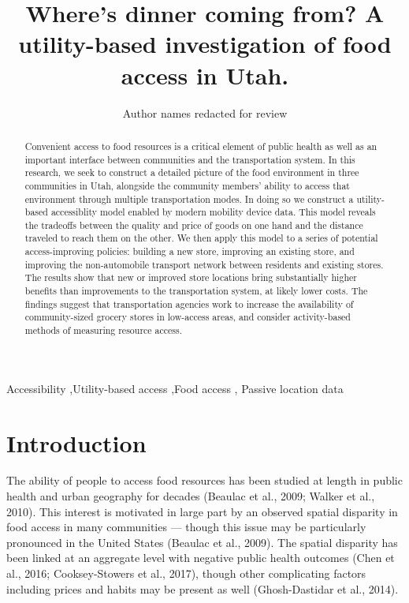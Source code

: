 \documentclass[
  letterpaper,
  number,
  review,
  3p]{elsarticle}
\begin{document}
\begin{frontmatter}
\title{Where's dinner coming from? A utility-based investigation of food
access in Utah.}
\author{Author names redacted for review}




        
\begin{abstract}
Convenient access to food resources is a critical element of public
health as well as an important interface between communities and the
transportation system. In this research, we seek to construct a detailed
picture of the food environment in three communities in Utah, alongside
the community members' ability to access that environment through
multiple transportation modes. In doing so we construct a utility-based
accessiblity model enabled by modern mobility device data. This model
reveals the tradeoffs between the quality and price of goods on one hand
and the distance traveled to reach them on the other. We then apply this
model to a series of potential access-improving policies: building a new
store, improving an existing store, and improving the non-automobile
transport network between residents and existing stores. The results
show that new or improved store locations bring substantially higher
benefits than improvements to the transportation system, at likely lower
costs. The findings suggest that transportation agencies work to
increase the availability of community-sized grocery stores in
low-access areas, and consider activity-based methods of measuring
resource access.
\end{abstract}





\begin{keyword}
    Accessibility \sep Utility-based access \sep Food access \sep 
    Passive location data
\end{keyword}
\end{frontmatter}
    

\section{Introduction}\label{introduction}

The ability of people to access food resources has been studied at
length in public health and urban geography for decades (Beaulac et al.,
2009; Walker et al., 2010). This interest is motivated in large part by
an observed spatial disparity in food access in many communities ---
though this issue may be particularly pronounced in the United States
(Beaulac et al., 2009). The spatial disparity has been linked at an
aggregate level with negative public health outcomes (Chen et al., 2016;
Cooksey-Stowers et al., 2017), though other complicating factors
including prices and habits may be present as well (Ghosh-Dastidar et
al., 2014).
\end{document}
